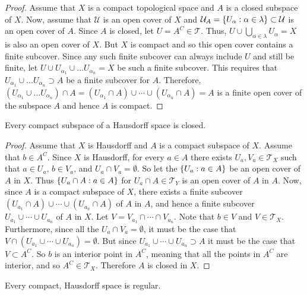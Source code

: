 \documentclass[letterpaper,12pt,fleqn]{article}
\newcommand{\U}{\mathcal{U}}
\renewcommand{\a}{\alpha}
\renewcommand{\l}{\lambda}
\newcommand{\T}{\mathscr{T}}
\begin{document}
\begin{proof}
  Assume that \(X\) is a compact topological space and \(A\) is a closed subspace of \(X\).  Now, assume that
  \(\U\) is an open cover of \(X\) and \(\U_A=\set{U_{\a}:\a\in\l}\subset\U\) is an open cover of \(A\).  Since \(A\)
  is closed, let \(U=A^C\in\T\).  Thus, \(U\cup\bigcup_{\a\in\l}U_{\a}=X\) is also an open cover of \(X\).  But \(X\)
  is compact and so this open cover contains a finite subcover.  Since any such finite subcover can always include
  \(U\) and still be finite, let \(U\cup U_{\a_1}\cup\ldots U_{\a_n}=X\) be such a finite subcover.  This requires that
  \(U_{\a_1}\cup\ldots U_{\a_n}\supset A\) be a finite subcover for \(A\).  Therefore,
  \((U_{\a_1}\cup\ldots U_{\a_n})\cap A=(U_{\a_1}\cap A)\cup\cdots\cup(U_{\a_n}\cap A)=A\) is a finite open cover of the
  subspace \(A\) and hence \(A\) is compact.
\end{proof}

\begin{theorem}
  Every compact subspace of a Hausdorff space is closed.
\end{theorem}

\begin{proof}
  Assume that \(X\) is Hausdorff and \(A\) is a compact subspace of \(X\).  Assume that \(b\in A^C\).  Since \(X\)
  is Hausdorff, for every \(a\in A\) there exists \(U_a,V_a\in\T_X\) such that \(a\in U_a\), \(b\in V_a\), and
  \(U_a\cap V_a=\emptyset\).  So let the \(\{U_a:a\in A\}\) be an open cover of \(A\) in \(X\).  Thus
  \(\{U_a\cap A:a\in A\}\) for \(U_a\cap A\in\T_Y\) is an open cover of \(A\) in \(A\).  Now, since \(A\) is a
  compact subspace of \(X\), there exists a finite subcover \((U_{a_1}\cap A)\cup\cdots\cup(U_{a_n}\cap A)\) of
  \(A\) in \(A\), and hence a finite subcover \(U_{a_1}\cup\cdots\cup U_{a_n}\) of \(A\) in \(X\).  Let
  \(V=V_{a_1}\cap\cdots\cap V_{a_n}\).  Note that \(b\in V\) and \(V\in\T_X\).  Furthermore, since all the
  \(U_a\cap V_a=\emptyset\), it must be the case that \(V\cap(U_{a_1}\cup\cdots\cup U_{a_n})=\emptyset\).  But
  since \(U_{a_1}\cup\cdots\cup U_{a_n}\supset A\) it must be the case that \(V\subset A^C\).  So \(b\) is an
  interior point in \(A^C\), meaning that all the points in \(A^C\) are interior, and so \(A^C\in\T_X\).  Therefore
  \(A\) is closed in \(X\).
\end{proof}

\begin{lemma}
  Every compact, Hausdorff space is regular.
\end{lemma}
\end{document}
